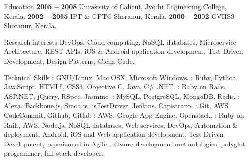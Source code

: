 \documentclass{resume}
\author{Abhilash M A}
\begin{document}
\maketitle


\begin{category}{Education}
   \hfill \textbf{2005 -- 2008}
  \citemnobullet University of Calicut, Jyothi Engineering College, Kerala.
   \hfill \textbf{2002 -- 2005}
  \citemnobullet IPT \& GPTC Shoranur, Kerala.
   \hfill \textbf{2000 -- 2002}
  \citemnobullet GVHSS Shoranur, Kerala.
\end{category}


\begin{category}{Research interests}
  \citemnobullet DevOps, Cloud computing, NoSQL databases, Microservice Architecture, REST APIs, iOS \& Android application development,
  Test Driven Development, Design Patterns, Clean Code.
\end{category}

\begin{category}{Technical Skills}
  : GNU/Linux, Mac OSX, Microsoft Windows.
  : Ruby, Python, JavaScript, HTML5, CSS3,
  Objective C, Java, C\# .NET.
  : Ruby on Rails, ASP.NET, jQuery, RSpec, Jasmine.
  : MySQL, PostgreSQL, MongoDB, Redis.
  : Alexa, Backbone.js, Sinon.js, jsTestDriver,
  Jenkins, Capistrano.
  : Git, AWS CodeCommit, Github, Gitlab
  : AWS, Google App Engine, Openstack.
  : Ruby on Rails, AWS, Node.js, NoSQL databases, Web services, DevOps, Automation \& deployment,
  Android, iOS and Web application development, Test Driven
  Development, experienced in Agile software development
  methodologies, polyglot programmer, full stack developer.
\end{category}

\end{document}
